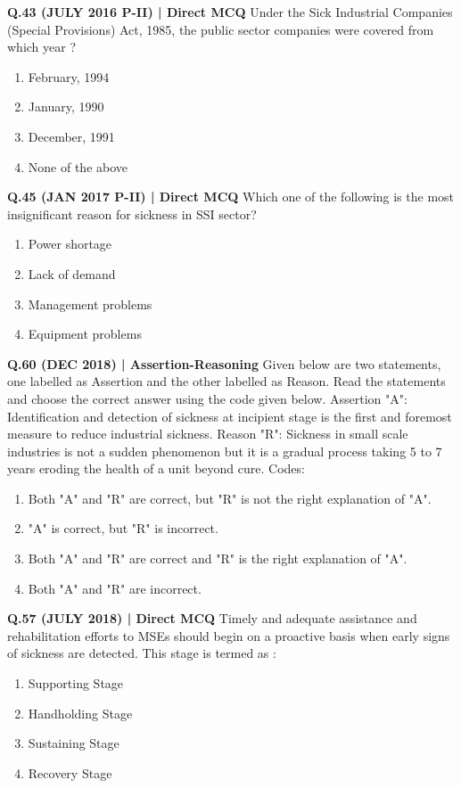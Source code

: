 \documentclass{article}
\begin{document}
\textbf{Q.43 (JULY 2016 P-II) | Direct MCQ}
Under the Sick Industrial Companies (Special Provisions) Act, 1985, the public sector companies were covered from which year ?
\begin{enumerate}[label=(\arabic*)]
    \item February, 1994
    \item January, 1990
    \item December, 1991
    \item None of the above
\end{enumerate}

\textbf{Q.45 (JAN 2017 P-II) | Direct MCQ}
Which one of the following is the most insignificant reason for sickness in SSI sector?
\begin{enumerate}[label=(\arabic*)]
    \item Power shortage
    \item Lack of demand
    \item Management problems
    \item Equipment problems
\end{enumerate}

\textbf{Q.60 (DEC 2018) | Assertion-Reasoning}
Given below are two statements, one labelled as Assertion and the other labelled as Reason. Read the statements and choose the correct answer using the code given below.
Assertion "A": Identification and detection of sickness at incipient stage is the first and foremost measure to reduce industrial sickness.
Reason "R": Sickness in small scale industries is not a sudden phenomenon but it is a gradual process taking 5 to 7 years eroding the health of a unit beyond cure.
Codes:
\begin{enumerate}[label=(\arabic*)]
    \item Both "A" and "R" are correct, but "R" is not the right explanation of "A".
    \item "A" is correct, but "R" is incorrect.
    \item Both "A" and "R" are correct and "R" is the right explanation of "A".
    \item Both "A" and "R" are incorrect.
\end{enumerate}

\textbf{Q.57 (JULY 2018) | Direct MCQ}
Timely and adequate assistance and rehabilitation efforts to MSEs should begin on a proactive basis when early signs of sickness are detected. This stage is termed as :
\begin{enumerate}[label=(\arabic*)]
    \item Supporting Stage
    \item Handholding Stage
    \item Sustaining Stage
    \item Recovery Stage
\end{enumerate}
\end{document}
